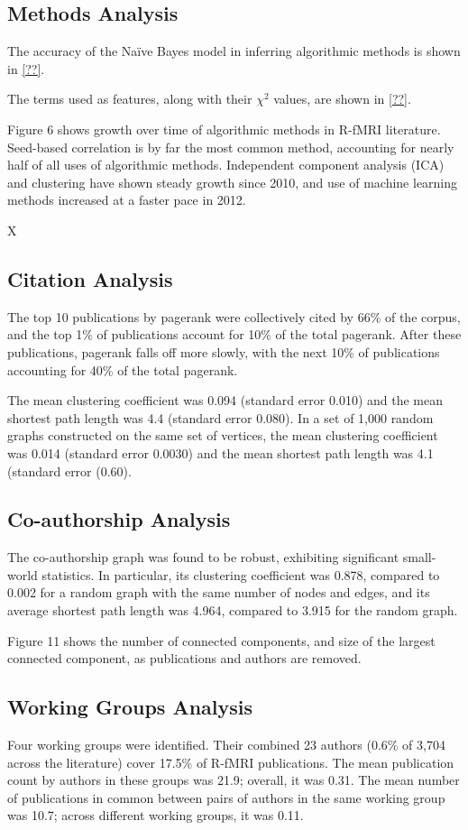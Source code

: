 \documentclass[12pt,3p]{elsarticle}
\begin{document}
\subsection{Methods Analysis}

The accuracy of the Na\"ive Bayes model in inferring
algorithmic methods is shown in \ref{??}.

The terms used as features, along with their $\chi^2$ values, are shown in
\ref{??}.

Figure 6 shows growth over time of algorithmic methods in R-fMRI literature.
Seed-based correlation is by far the most common method, accounting for nearly
half of all uses of algorithmic methods. Independent component analysis (ICA)
and clustering have shown steady growth since 2010, and use of machine learning
methods increased at a faster pace in 2012.

X\subsection{Citation Analysis} 
The top 10 publications by pagerank were collectively cited by 66\% of the
corpus, and the top 1\% of publications account for 10\% of the total pagerank.
After these publications, pagerank falls off more slowly, with the next 10\% of
publications accounting for 40\% of the total pagerank. 

The mean clustering coefficient was 0.094 (standard error 0.010) and the mean
shortest path length was 4.4 (standard error 0.080). In a set of 1,000 random
graphs constructed on the same set of vertices, the mean clustering coefficient
was 0.014 (standard error 0.0030) and the mean shortest path length was 4.1
(standard error (0.60).

\subsection{Co-authorship Analysis}
The co-authorship graph was found to be robust, exhibiting significant
small-world statistics. In particular, its clustering coefficient was 0.878,
compared to 0.002 for a random graph with the same number of nodes and edges,
and its average shortest path length was 4.964, compared to 3.915 for the random
graph.

Figure 11 shows the number of connected components, and size of the largest
connected component, as publications and authors are removed.  

\subsection{Working Groups Analysis}
Four working groups were identified. Their
combined 23 authors (0.6\% of 3,704 across the literature) cover 17.5\% of R-fMRI
publications. The mean publication count by authors in these groups was 21.9;
overall, it was 0.31. The mean number of publications in common between pairs of
authors in the same working group was 10.7; across different working groups, it
was 0.11.  
\end{document}
